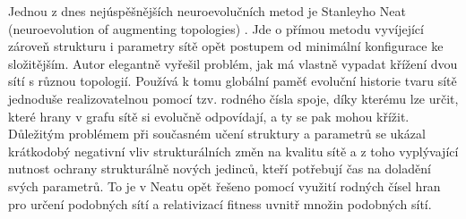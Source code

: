 Jednou z dnes nejúspěšnějších neuroevolučních metod je Stanleyho Neat (neuroevolution of augmenting topologies) \cite{stanley}. Jde o přímou metodu vyvíjející zároveň strukturu i parametry sítě opět postupem od minimální konfigurace ke složitějším. Autor elegantně vyřešil problém, jak má vlastně vypadat křížení dvou sítí s různou topologií. Používá k tomu globální paměť evoluční historie tvaru sítě jednoduše realizovatelnou pomocí tzv. rodného čísla spoje, díky kterému lze určit, které hrany v grafu sítě si evolučně odpovídají, a ty se pak mohou křížit. Důležitým problémem při současném učení struktury a parametrů se ukázal krátkodobý negativní vliv strukturálních změn na kvalitu sítě a z toho vyplývající nutnost ochrany strukturálně nových jedinců, kteří potřebují čas na doladění svých parametrů. To je v Neatu opět řešeno pomocí využití rodných čísel hran pro určení podobných sítí a relativizací fitness uvnitř množin podobných sítí. 

